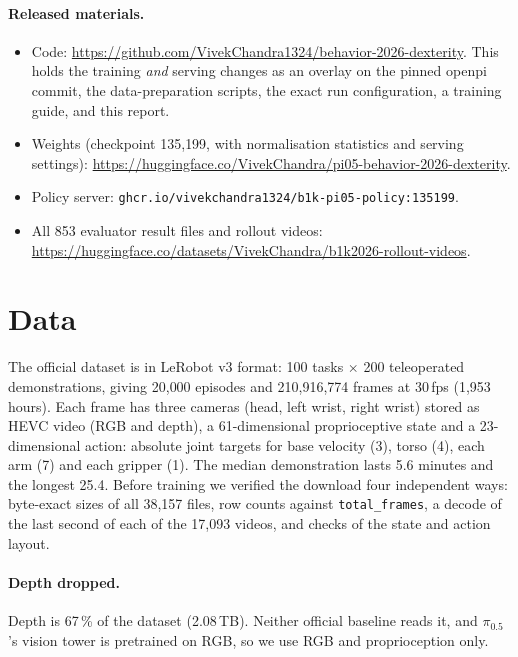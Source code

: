 \documentclass[10pt]{article}
\newcommand{\pizf}{$\pi_{0.5}$}
\begin{document}
\paragraph{Released materials.}
\begin{itemize}
\item Code: \url{https://github.com/VivekChandra1324/behavior-2026-dexterity}. This holds the training \emph{and} serving
  changes as an overlay on the pinned openpi commit, the data-preparation scripts, the exact run configuration, a
  training guide, and this report.
\item Weights (checkpoint 135{,}199, with normalisation statistics and serving settings):
  \url{https://huggingface.co/VivekChandra/pi05-behavior-2026-dexterity}.
\item Policy server: \texttt{ghcr.io/vivekchandra1324/b1k-pi05-policy:135199}.
\item All 853 evaluator result files and rollout videos:
  \url{https://huggingface.co/datasets/VivekChandra/b1k2026-rollout-videos}.
\end{itemize}

\section{Data}
\label{sec:data}
The official dataset is in LeRobot v3 format: 100 tasks $\times$ 200 teleoperated demonstrations, giving 20{,}000
episodes and 210{,}916{,}774 frames at 30\,fps (1{,}953 hours). Each frame has three cameras (head, left wrist, right
wrist) stored as HEVC video (RGB and depth), a 61-dimensional proprioceptive state and a 23-dimensional action:
absolute joint targets for base velocity (3), torso (4), each arm (7) and each gripper (1). The median demonstration
lasts 5.6 minutes and the longest 25.4. Before training we verified the download four independent ways: byte-exact
sizes of all 38{,}157 files, row counts against \texttt{total\_frames}, a decode of the last second of each of the
17{,}093 videos, and checks of the state and action layout.

\paragraph{Depth dropped.} Depth is 67\,\% of the dataset (2.08\,TB). Neither official baseline reads it, and
\pizf{}'s vision tower is pretrained on RGB, so we use RGB and proprioception only.
\end{document}
